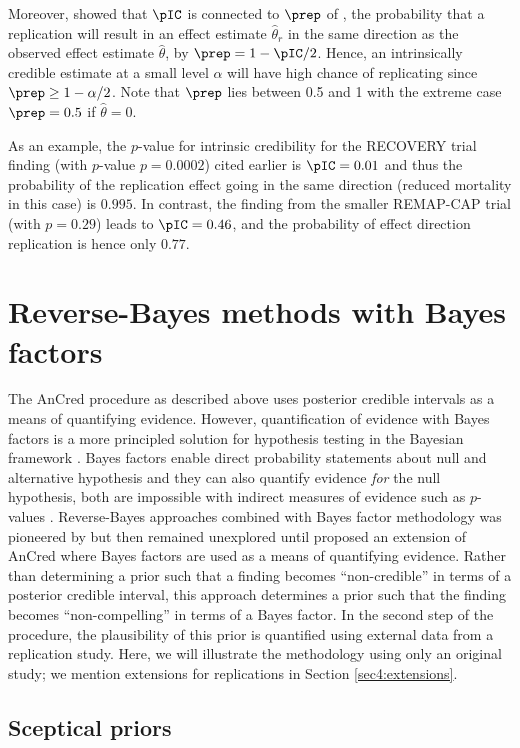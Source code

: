 Moreover, \citet{Held2019a} showed that $\pIC$ is connected to $\prep$ of
\citet{Killeen2005}, the probability that a replication will result in an effect
estimate $\hat{\theta}_r$ in the same direction as the observed effect estimate
$\hat{\theta}$, by $\prep = 1 - \pIC/2$. Hence, an intrinsically credible
estimate at a small level $\alpha$ will have high chance of replicating since
$\prep \geq 1 - \alpha/2$. Note that $\prep$ lies between 0.5 and 1 with the
extreme case $\prep=0.5$ if $\hat \theta=0$.

As an example, the $p$-value for intrinsic credibility for the RECOVERY trial
finding (with $p$-value $p=0.0002$) cited earlier is $\pIC = 0.01$ and thus the
probability of the replication effect going in the same direction (\ie reduced
mortality in this case) is $0.995$. In contrast, the finding from the smaller
REMAP-CAP trial (with $p=0.29$) leads to $\pIC = 0.46$, and the probability of
effect direction replication is hence only $0.77$.

\section{Reverse-Bayes methods with Bayes factors}
\label{sec4:bfs}
The AnCred procedure as described above uses posterior credible intervals as a
means of quantifying evidence. However, quantification of evidence with Bayes
factors is a more principled solution for hypothesis testing in the Bayesian
framework \citep{Jeffreys1961, Kass1995}. Bayes factors enable direct
probability statements about null and alternative hypothesis and they can also
quantify evidence \emph{for} the null hypothesis, both are impossible with
indirect measures of evidence such as $p$-values \citep{Held2018}.
Reverse-Bayes approaches combined with Bayes factor methodology was pioneered by
\citet{Carlin1996} but then remained unexplored until \citet{Pawel2020b}
proposed an extension of AnCred where Bayes factors are used as a means of
quantifying evidence. Rather than determining a prior such that a finding
becomes ``non-credible'' in terms of a posterior credible interval, this
approach determines a prior such that the finding becomes ``non-compelling'' in
terms of a Bayes factor. In the second step of the procedure, the plausibility
of this prior is quantified using external data from a replication study. Here,
we will illustrate the methodology using only an original study; we mention
extensions for replications in Section \ref{sec4:extensions}.

\subsection{Sceptical priors}\label{sec4:sceptical}

